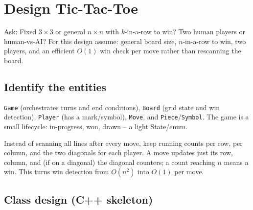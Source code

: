 \section{Design Tic-Tac-Toe}
\label{sec:case-tic-tac-toe}


\begin{patternbox}
Ask: Fixed $3\times3$ or general $n\times n$ with $k$-in-a-row to win? Two
human players or human-vs-AI? For this design assume: general board size,
$n$-in-a-row to win, two players, and an efficient $O(1)$ win check per
move rather than rescanning the board.
\end{patternbox}

\subsection*{Identify the entities}

\texttt{Game} (orchestrates turns and end conditions), \texttt{Board}
(grid state and win detection), \texttt{Player} (has a mark/symbol),
\texttt{Move}, and \texttt{Piece}/\texttt{Symbol}. The game is a small
lifecycle: in-progress, won, drawn -- a light State/enum.

\begin{ideabox}
Instead of scanning all lines after every move, keep running counts per
row, per column, and the two diagonals for each player. A move updates
just its row, column, and (if on a diagonal) the diagonal counters; a
count reaching $n$ means a win. This turns win detection from $O(n^2)$
into $O(1)$ per move.
\end{ideabox}

\subsection*{Class design (C++ skeleton)}

